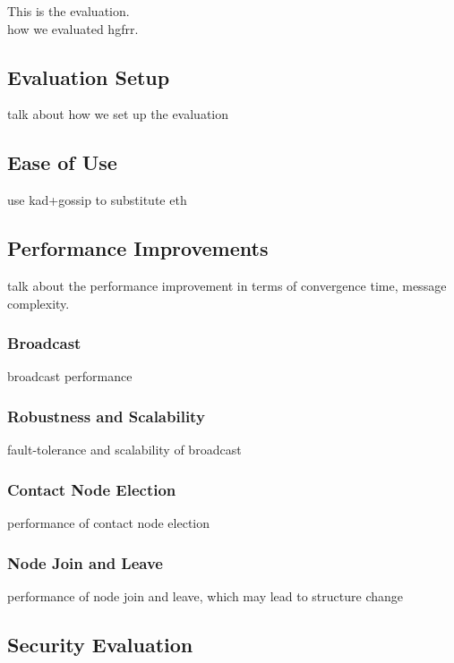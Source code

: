 This is the evaluation. \\

how we evaluated hgfrr.

\subsection{Evaluation Setup}

talk about how we set up the evaluation

\subsection{Ease of Use}

use kad+gossip to substitute eth

\subsection{Performance Improvements}

talk about the performance improvement in terms of convergence time, message complexity.

\subsubsection{Broadcast}

broadcast performance

\subsubsection{Robustness and Scalability}

fault-tolerance and scalability of broadcast

\subsubsection{Contact Node Election}

performance of contact node election

\subsubsection{Node Join and Leave}

performance of node join and leave, which may lead to structure change

\subsection{Security Evaluation}

